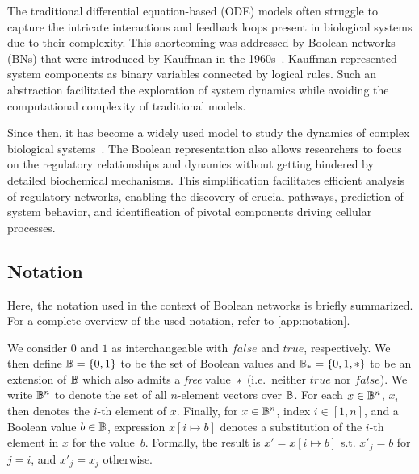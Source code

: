 The traditional differential equation-based (ODE) models often struggle to capture the intricate interactions and feedback loops present in biological systems due to their complexity. This shortcoming was addressed by Boolean networks (BNs) that were introduced by Kauffman in the 1960s~\cite{Kauffman1969}. Kauffman represented system components as binary variables connected by logical rules. Such an abstraction facilitated the exploration of system dynamics while avoiding the computational complexity of traditional models. 

Since then, it has become a widely used model to study the dynamics of complex biological systems~\cite{Barbuti2020,albert2004}. The Boolean representation also allows researchers to focus on the regulatory relationships and dynamics without getting hindered by detailed biochemical mechanisms. This simplification facilitates efficient analysis of regulatory networks, enabling the discovery of crucial pathways, prediction of system behavior, and identification of pivotal components driving cellular processes.

\subsection{Notation}

Here, the notation used in the context of Boolean networks is briefly summarized. For a complete overview of the used notation, refer to \autoref{app:notation}.

We consider $0$ and $1$ as interchangeable with $\mathit{false}$ and $\mathit{true}$, respectively. We then define $\mathbb{B} = \{ 0, 1 \}$ to be the set of Boolean values and $\mathbb{B}_{{*}} = \{ 0, 1, {{*}} \}$ to be an extension of $\mathbb{B}$ which also admits a \emph{free} value~${*}$ (i.e.~neither $\mathit{true}$ nor $\mathit{false}$). We write $\mathbb{B}^n$ to denote the set of all $n$-element vectors over $\mathbb{B}$. For each $x \in \mathbb{B}^n$, $x_i$ then denotes the $i$-th element of $x$. Finally, for $x \in \mathbb{B}^n$, index $i \in [1,n]$, and a Boolean value $b \in \mathbb{B}$, expression $x[i \mapsto b]$ denotes a substitution of the $i$-th element in $x$ for the value~$b$.  Formally, the result is $x' = x[i \mapsto b]$ s.t. $x'_j = b$ for $j = i$, and $x'_j = x_j$ otherwise.


